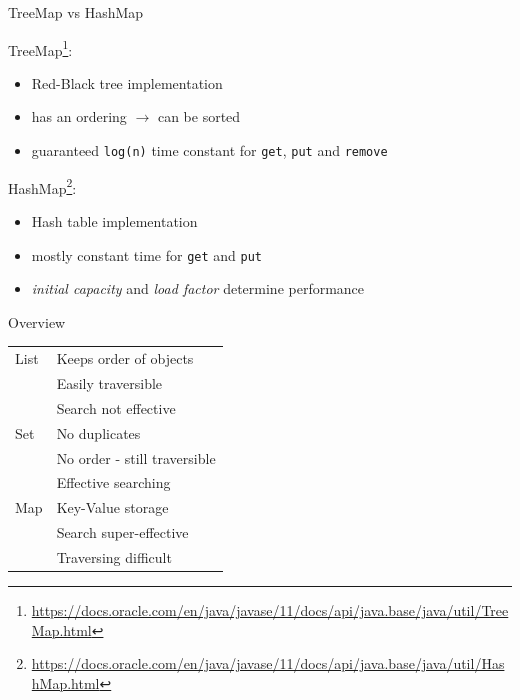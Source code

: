 	
	\begin{frame}[allowframebreaks]{TreeMap vs HashMap}
		
		TreeMap\footnote{ \url{https://docs.oracle.com/en/java/javase/11/docs/api/java.base/java/util/TreeMap.html}}:
		\begin{itemize}
			\item Red-Black tree implementation
			\item has an ordering $\rightarrow$ can be sorted
			\item guaranteed \texttt{log(n)} time constant for \texttt{get}, \texttt{put} and \texttt{remove}
		\end{itemize}
		
		\framebreak
		HashMap\footnote{\url{https://docs.oracle.com/en/java/javase/11/docs/api/java.base/java/util/HashMap.html}}:
		\begin{itemize}
			\item Hash table implementation
			\item mostly constant time for \texttt{get} and \texttt{put}
			\item \textit{initial capacity} and \textit{load factor} determine performance
		\end{itemize}
		
		
	\end{frame}
	\begin{frame}{Overview}
		\begin{center}
			\begin{tabular}{ l | l }
				List & Keeps order of objects \\
				& Easily traversible \\
				& Search not effective \\
				\hline
				Set  & No duplicates \\
				& No order - still traversible \\
				& Effective searching \\
				\hline
				Map  & Key-Value storage \\
				& Search super-effective \\
				& Traversing difficult
				
			\end{tabular}
		\end{center}
	\end{frame}
	
	
		
